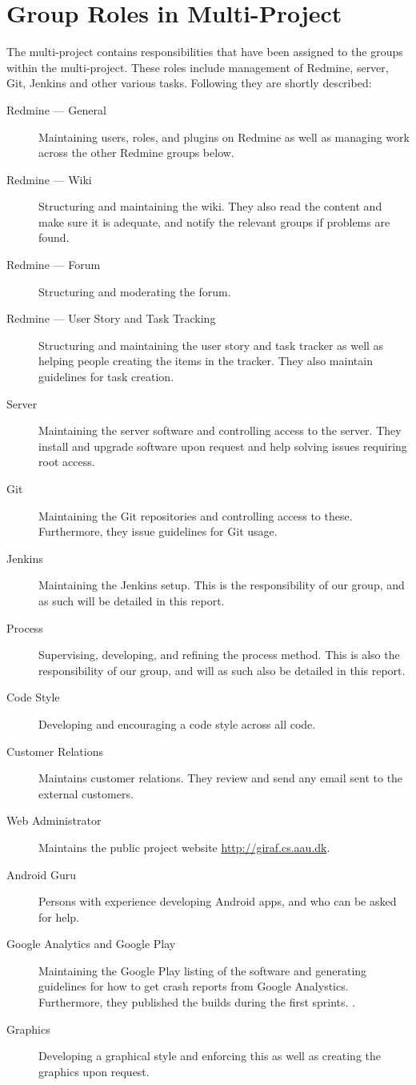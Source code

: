 \section{Group Roles in Multi-Project}\label{sec:multi_project_group_roles}
The multi-project contains responsibilities that have been assigned to the groups within the multi-project. These roles include management of Redmine, server, Git, Jenkins and other various tasks. Following they are shortly described:

\begin{description}
  \item[Redmine --- General] Maintaining users, roles, and plugins on Redmine as well as managing work across the other Redmine groups below.
  \item[Redmine --- Wiki] Structuring and maintaining the wiki. They also read the content and make sure it is adequate, and notify the relevant groups if problems are found.
  \item[Redmine --- Forum] Structuring and moderating the forum.
  \item[Redmine --- User Story and Task Tracking] Structuring and maintaining the user story and task tracker as well as helping people creating the items in the tracker. They also maintain guidelines for task creation.
  \item[Server] Maintaining the server software and controlling access to the server. They install and upgrade software upon request and help solving issues requiring root access.
  \item[Git] Maintaining the Git repositories and controlling access to these. Furthermore, they issue guidelines for Git usage.
  \item[Jenkins] Maintaining the Jenkins setup. This is the responsibility of our group, and as such will be detailed in this report.
  \item[Process] Supervising, developing, and refining the process method. This is also the responsibility of our group, and will as such also be detailed in this report.
  \item[Code Style] Developing and encouraging a code style across all code.
  \item[Customer Relations] Maintains customer relations. They review and send any email sent to the external customers.
  \item[Web Administrator] Maintains the public project website \url{http://giraf.cs.aau.dk}.
  \item[Android Guru] Persons with experience developing Android apps, and who can be asked for help.
  \item[Google Analytics and Google Play] Maintaining the Google Play listing of the software and generating guidelines for how to get crash reports from Google Analystics. Furthermore, they published the builds during the first sprints. .
  \item[Graphics] Developing a graphical style and enforcing this as well as creating the graphics upon request.
\end{description}

 

